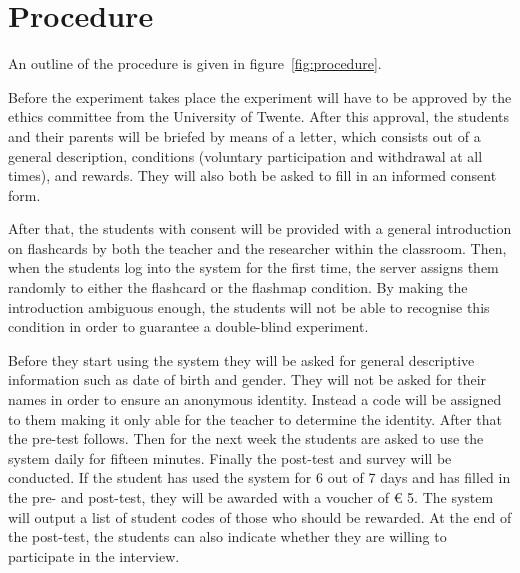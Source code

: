 \section{Procedure}



An outline of the procedure is given in figure~\ref{fig:procedure}.

Before the experiment takes place the experiment will have to be approved by the ethics committee from the University of Twente. After this approval, the students and their parents will be briefed by means of a letter, which consists out of a general description, conditions (voluntary participation and withdrawal at all times), and rewards. They will also both be asked to fill in an informed consent form.

After that, the students with consent will be provided with a general introduction on flashcards by both the teacher and the researcher within the classroom. Then, when the students log into the system for the first time, the server assigns them randomly to either the flashcard or the flashmap condition. By making the introduction ambiguous enough, the students will not be able to recognise this condition in order to guarantee a double-blind experiment.

Before they start using the system they will be asked for general descriptive information such as date of birth and gender. They will not be asked for their names in order to ensure an anonymous identity. Instead a code will be assigned to them making it only able for the teacher to determine the identity. After that the pre-test follows. Then for the next week the students are asked to use the system daily for fifteen minutes. Finally the post-test and survey will be conducted. If the student has used the system for 6 out of 7 days and has filled in the pre- and post-test, they will be awarded with a voucher of \euro{} 5. The system will output a list of student codes of those who should be rewarded. At the end of the post-test, the students can also indicate whether they are willing to participate in the interview.

